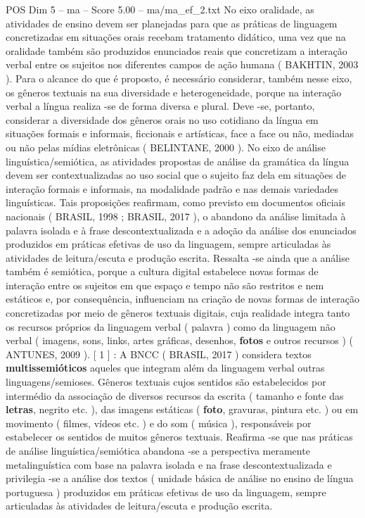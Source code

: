 \begin{textsample}{POS Dim 5 – ma – Score 5.00 – ma/ma\_ef\_2.txt}
No eixo oralidade, as atividades de ensino devem ser planejadas para que as práticas de linguagem concretizadas em situações orais recebam tratamento didático, uma vez que na oralidade também são produzidos enunciados reais que concretizam a interação verbal entre os sujeitos nos diferentes campos de ação humana ( BAKHTIN, 2003 ).
Para o alcance do que é proposto, é necessário considerar, também nesse eixo, os gêneros textuais na sua diversidade e heterogeneidade, porque na interação verbal a língua realiza -se de forma diversa e plural.
Deve -se, portanto, considerar a diversidade dos gêneros orais no uso cotidiano da língua em situações formais e informais, ficcionais e artísticas, face a face ou não, mediadas ou não pelas mídias eletrônicas ( BELINTANE, 2000 ).
No eixo de análise linguística/semiótica, as atividades propostas de análise da gramática da língua devem ser contextualizadas ao uso social que o sujeito faz dela em situações de interação formais e informais, na modalidade padrão e nas demais variedades linguísticas.
Tais proposições reafirmam, como previsto em documentos oficiais nacionais ( BRASIL, 1998 ; BRASIL, 2017 ), o abandono da análise limitada à palavra isolada e à frase descontextualizada e a adoção da análise dos enunciados produzidos em práticas efetivas de uso da linguagem, sempre articuladas às atividades de leitura/escuta e produção escrita.
Ressalta -se ainda que a análise também é semiótica, porque a cultura digital estabelece novas formas de interação entre os sujeitos em que espaço e tempo não são restritos e nem estáticos e, por consequência, influenciam na criação de novas formas de interação concretizadas por meio de gêneros textuais digitais, cuja realidade integra tanto os recursos próprios da linguagem verbal ( palavra ) como da linguagem não verbal ( imagens, sons, links, artes gráficas, desenhos, \textbf{fotos} e outros recursos ) ( ANTUNES, 2009 ). [ 1 ] : A BNCC ( BRASIL, 2017 ) considera textos \textbf{multissemióticos} aqueles que integram além da linguagem verbal outras linguagens/semioses.
Gêneros textuais cujos sentidos são estabelecidos por intermédio da associação de diversos recursos da escrita ( tamanho e fonte das \textbf{letras}, negrito etc. ), das imagens estáticas ( \textbf{foto}, gravuras, pintura etc. ) ou em movimento ( filmes, vídeos etc. ) e do som ( música ), responsáveis por estabelecer os sentidos de muitos gêneros textuais.
Reafirma -se que nas práticas de análise linguística/semiótica abandona -se a perspectiva meramente metalinguística com base na palavra isolada e na frase descontextualizada e privilegia -se a análise dos textos ( unidade básica de análise no ensino de língua portuguesa ) produzidos em práticas efetivas de uso da linguagem, sempre articuladas às atividades de leitura/escuta e produção escrita.

\end{textsample}
